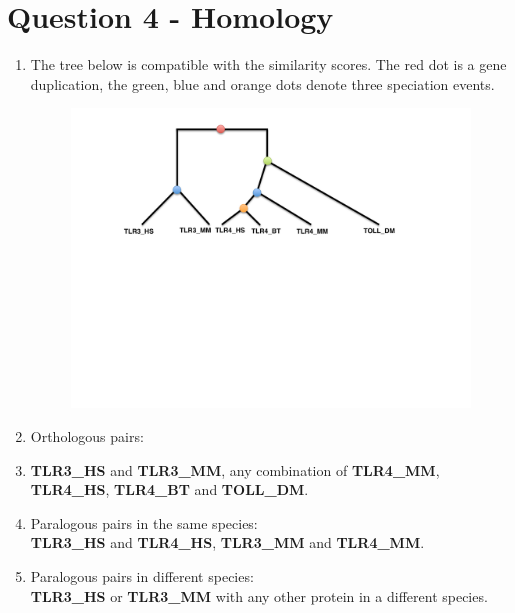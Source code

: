 \documentclass[a4paper,11pt]{article}
\begin{document}
\pagebreak

\section*{Question 4 - Homology}

\begin{enumerate}
\item The tree below is compatible with the similarity scores. The red
  dot is a gene duplication, the green, blue and orange dots denote
  three speciation events.

\begin{figure}[h]
\centering\includegraphics[scale=.6]{TreeSolution.pdf}
\end{figure}




\item Orthologous pairs:\\
  \item \textbf{TLR3\_HS} and \textbf{TLR3\_MM}, any combination of
    \textbf{TLR4\_MM}, \textbf{TLR4\_HS}, \textbf{TLR4\_BT} and \textbf{TOLL\_DM}.
\item Paralogous pairs in the same species:\\
\textbf{TLR3\_HS} and \textbf{TLR4\_HS}, \textbf{TLR3\_MM} and \textbf{TLR4\_MM}.
\item Paralogous pairs in different species:\\
\textbf{TLR3\_HS} or \textbf{TLR3\_MM} with any other protein in a
different species.
\end{enumerate}
\end{document}
